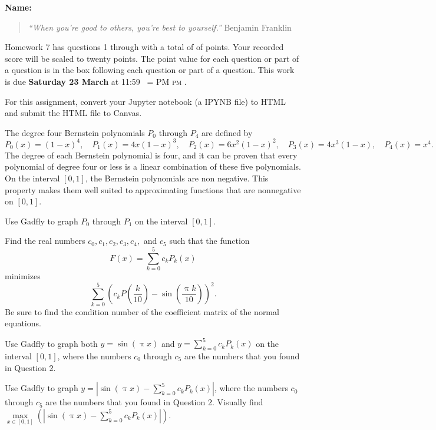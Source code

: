 \documentclass[12pt,fleqn]{exam}
\makeatletter
\newcommand{\quiz}{7}
\newcommand{\term}{Spring}
\DeclareRobustCommand{\maybefakesc}[1]{%
  \ifnum\pdfstrcmp{\f@series}{\bfdefault}=\z@
    {\fontsize{\dimexpr0.8\dimexpr\f@size pt\relax}{0}\selectfont\uppercase{#1}}%
  \else
    \textsc{#1}%
  \fi
}
\newcommand\PM{\,\maybefakesc{pm}\xspace}
\makeatother
\begin{document}
\vspace{0.1in}
\noindent{}
{\bf Name:}  \\
\noindent \makebox[3.0truein][l]{\textbf{Homework \quiz, \term \/ \the\year}}
\vspace{0.1in}

\begin{quote}
\noindent \emph{“When you’re good to others, you’re best to yourself.”} \hfill {\sc Benjamin Franklin}
\end{quote}

\noindent  Homework \quiz\/  has questions 1 through  \numquestions \/ with a total of of  \numpoints\/  points. 
Your recorded score will be scaled to twenty points. The point
value for each question or part of a question is in the box following each question or part of a question.
This work is due \textbf{Saturday 23 March  } at 11:59 \PM.  

For this assignment, convert your Jupyter notebook (a IPYNB file)  to HTML and submit the HTML file to Canvas.

The degree four Bernstein polynomials $P_0$ through $P_4$ are defined by
\begin{equation}
P_0(x) = (1-x)^4, \quad P_1(x)  = 4 x (1-x)^3, \quad P_2(x) = 6 x^2 (1-x)^2, \quad P_3(x) = 4 x^3 (1-x),
\quad P_4(x) = x^4.
\end{equation}
The degree of each Bernstein polynomial is four, and it can be proven that every polynomial of degree four or less is a linear
combination of these five polynomials.  On the interval $[0,1]$, the Bernstein polynomials are non negative. This 
property makes them well suited to approximating functions that are nonnegative on $[0,1]$.  
\begin{questions}

\question [5] Use Gadfly to graph $P_0$ through $P_1$ on the interval $[0,1]$.

\question [5] Find the real numbers $c_0, c_1, c_2,c_3, c_4,$ and $c_5$ such that the function 
\begin{equation}
  F(x) = \sum_{k=0}^5 c_k P_k(x)
\end{equation}
minimizes
\begin{equation}
   \sum_{k=0}^5 \left(c_k P \left (\frac{k}{10} \right) - \sin\left(\frac{\uppi k}{10}\right) \right)^2.
 \end{equation}
 Be sure to find the condition number of the coefficient matrix of the normal equations.

\question [5] Use Gadfly to graph both $y = \sin(\uppi x)$ and $ y = \sum_{k=0}^5 c_k P_k(x)$ on the interval $[0,1]$, where the numbers
$c_0$ through $c_5$ are the numbers that you found in Question 2.

\question [5] Use Gadfly to graph  $y = \left| \sin(\uppi x) -  \sum_{k=0}^5 c_k P_k(x) \right| $, where the numbers
$c_0$ through $c_5$ are the numbers that you found in Question 2.  Visually find $\underset{x \in [0,1]}{\max} 
\left(\left| \sin(\uppi x) -  \sum_{k=0}^5 c_k P_k(x) \right| \right).$
\end{questions}
\end{document}
